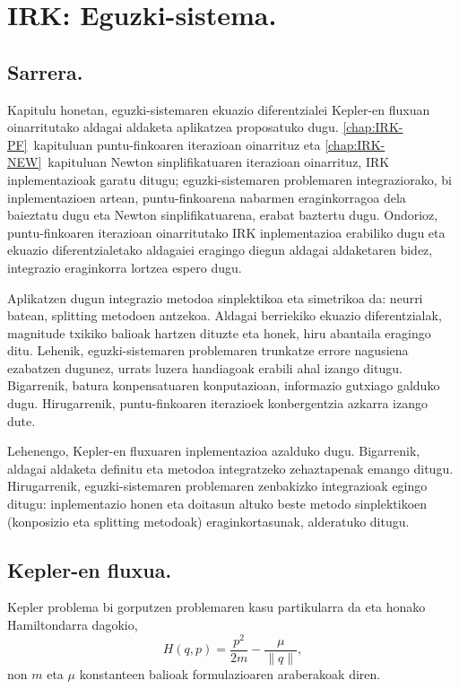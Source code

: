 \chapter{IRK: Eguzki-sistema.}


\section{Sarrera.}
  

Kapitulu honetan, eguzki-sistemaren ekuazio diferentzialei Kepler-en fluxuan oinarritutako aldagai aldaketa aplikatzea proposatuko dugu. \ref{chap:IRK-PF}~kapituluan puntu-finkoaren iterazioan oinarrituz eta \ref{chap:IRK-NEW}~kapituluan Newton sinplifikatuaren iterazioan oinarrituz, IRK inplementazioak garatu ditugu; eguzki-sistemaren problemaren integraziorako, bi inplementazioen artean, puntu-finkoarena nabarmen eraginkorragoa dela baieztatu dugu eta Newton sinplifikatuarena, erabat baztertu dugu. Ondorioz, puntu-finkoaren iterazioan oinarritutako IRK inplementazioa erabiliko dugu eta  ekuazio diferentzialetako aldagaiei eragingo diegun aldagai aldaketaren bidez, integrazio eraginkorra lortzea espero dugu.  

Aplikatzen dugun integrazio metodoa sinplektikoa eta simetrikoa da: neurri batean, splitting metodoen antzekoa. Aldagai berriekiko ekuazio diferentzialak, magnitude txikiko balioak hartzen dituzte eta honek, hiru abantaila eragingo ditu. Lehenik, eguzki-sistemaren problemaren trunkatze errore nagusiena ezabatzen dugunez, urrats luzera handiagoak erabili ahal izango ditugu. Bigarrenik, batura konpensatuaren konputazioan, informazio gutxiago galduko dugu. Hirugarrenik, puntu-finkoaren iterazioek konbergentzia azkarra izango dute. 

Lehenengo, Kepler-en fluxuaren inplementazioa azalduko dugu. Bigarrenik, aldagai aldaketa definitu eta metodoa integratzeko zehaztapenak emango ditugu. Hirugarrenik, eguzki-sistemaren problemaren zenbakizko integrazioak egingo ditugu: inplementazio honen eta doitasun altuko beste metodo sinplektikoen (konposizio eta splitting metodoak) eraginkortasunak, alderatuko ditugu.     

 

\section{Kepler-en fluxua.}
   
   
Kepler problema bi gorputzen problemaren kasu partikularra da eta  honako Hamiltondarra dagokio,
\begin{equation}
\label{eq: hamkepler}
H(q,p)=\frac{p^2}{2m}-\frac{\mu}{\|q\|},
\end{equation}
non $m$ eta $\mu$ konstanteen balioak  formulazioaren araberakoak diren.

